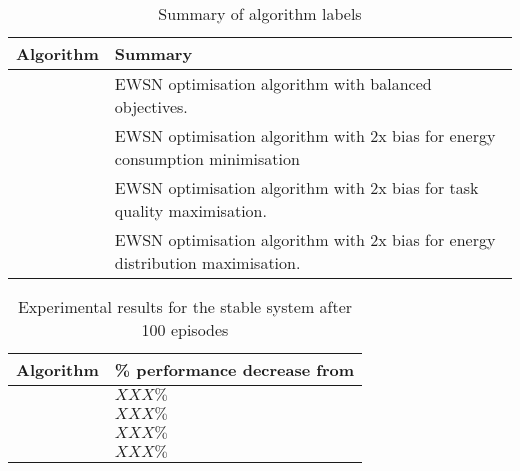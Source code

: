 \begin{table}[h]

	\begin{tabular}
		{|p{}|p{}|}
		\hline
		\textbf{Algorithm} & \textbf{Summary}\\
		\hline
		\simulationEWSN{}{} &  EWSN optimisation algorithm with balanced objectives. \\
		\simulationEWSNEnergy{}{} & EWSN optimisation algorithm with 2x bias for energy consumption minimisation \\
		\simulationEWSNQuality{}{} & EWSN optimisation algorithm with 2x bias for task quality maximisation. \\
		\simulationEWSNDistribution{}{} & EWSN optimisation algorithm with 2x bias for energy distribution maximisation. \\
		\hline
	\end{tabular}
	\captionsetup{labelfont=bf,singlelinecheck=on}
\caption{Summary of algorithm labels}
\label{table:summary_of_algorithms}
\end{table}

\label{section:tables_results}
\begin{table}[H]
	
	\begin{tabular}{
			|p{}|p{}|
		}
		\hline
		\textbf{Algorithm} & \textbf{\% performance decrease from \simulationOptimal{}{}} \\
		\hline
		\simulationEWSN{}{} & $XXX\%$  \\
		\simulationEWSNEnergy{}{} & $XXX\%$ \\
		\simulationEWSNQuality{}{} & $XXX\%$ \\
		\simulationEWSNDistribution{}{} &  $XXX\%$ \\
		\hline
	\end{tabular}
\centering
\captionsetup{labelfont=bf,singlelinecheck=on,justification=raggedright}
\caption{Experimental results for the stable system after 100 episodes}
\label{table:experimental_results_stable}
\end{table}
